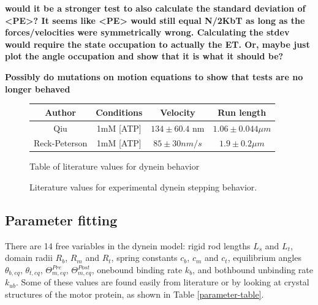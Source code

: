 \documentclass[10pt]{article} %
\begin{document}
\textbf{would it be a stronger test to also calculate the standard deviation of <PE>? It seems like <PE> would still equal N/2KbT as long as the forces/velocities were symmetrically wrong. Calculating the stdev would require the state occupation to actually the ET. Or, maybe just plot the angle occupation and show that it is what it should be?}

\textbf{Possibly do mutations on motion equations to show that tests are no longer behaved}

\begin{figure}[h]
  \centering
  \begin{tabular}{| c | c | c | c |}
    \hline
    Author & Conditions & Velocity & Run length\\\hline
    Qiu \cite{weihongpaper} & 1mM [ATP] & $134 \pm 60.4$ nm & $1.06 \pm 0.044 \mu m$\\ \hline
    Reck-Peterson \cite{reck2006single} & 1mM [ATP] & $85 \pm 30 nm/s$  & $1.9 \pm 0.2 \mu m$\\ \hline
  \end{tabular}
  \caption{Literature values for experimental dynein stepping behavior.}{Table of literature values for dynein behavior}
  \label{table:parameter-table}
\end{figure}




\subsection{Parameter fitting}
There are 14 free variables in the dynein model: rigid rod lengths $L_s$ and $L_t$, domain radii $R_b$, $R_m$ and $R_t$, spring constants $c_b$, $c_m$ and $c_t$, equilibrium angles $\theta_{b,eq}$, $\theta_{t,eq}$, $\Theta_{m,eq}^{Pre}$, $\Theta_{m,eq}^{Post}$, onebound binding rate $k_b$, and bothbound unbinding rate $k_{ub}$. Some of these values are found easily from literature or by looking at crystal structures of the motor protein, as shown in Table \ref{parameter-table}.\\
\end{document}
